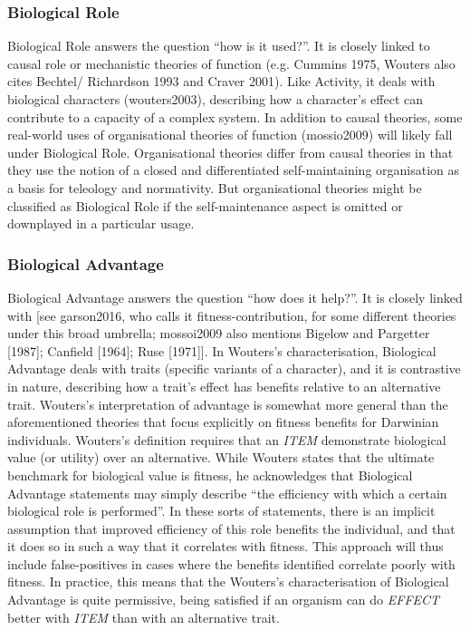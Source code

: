\documentclass{article}
\begin{document}
\subsubsection{Biological Role}
\label{sec:biological-role}

Biological Role answers the question ``how is it used?''.
It is closely linked to causal role or mechanistic theories of function (e.g. Cummins 1975, Wouters also cites Bechtel/ Richardson 1993 and Craver 2001).
Like Activity, it deals with biological characters (wouters2003), describing how a character's effect can contribute to a capacity of a complex system.
In addition to causal theories, some real-world uses of organisational theories of function (mossio2009) will likely fall under Biological Role.
Organisational theories differ from causal theories in that they use the notion of a closed and differentiated self-maintaining organisation as a basis for teleology and normativity.
But organisational theories might be classified as Biological Role if the self-maintenance aspect is omitted or downplayed in a particular usage.

\subsubsection{Biological Advantage}
\label{sec:biological-advantage}

Biological Advantage answers the question ``how does it help?''.
It is closely linked with [see garson2016, who calls it fitness-contribution, for some different theories under this broad umbrella; mossoi2009 also mentions Bigelow and Pargetter [1987]; Canfield [1964]; Ruse [1971]].
In Wouters's characterisation, Biological Advantage deals with traits (specific variants of a character), and it is contrastive in nature, describing how a trait's effect has benefits relative to an alternative trait.
Wouters's interpretation of advantage is somewhat more general than the aforementioned theories that focus explicitly on fitness benefits for Darwinian individuals.
Wouters's definition requires that an \emph{ITEM} demonstrate biological value (or utility) over an alternative.
While Wouters states that the ultimate benchmark for biological value is fitness, he acknowledges that Biological Advantage statements may simply describe ``the efficiency with which a certain biological role is performed''.
In these sorts of statements, there is an implicit assumption that improved efficiency of this role benefits the individual, and that it does so in such a way that it correlates with fitness.
This approach will thus include false-positives in cases where the benefits identified correlate poorly with fitness.
In practice, this means that the Wouters's characterisation of Biological Advantage is quite permissive, being satisfied if an organism can do \emph{EFFECT} better with \emph{ITEM} than with an alternative trait.
\end{document}

